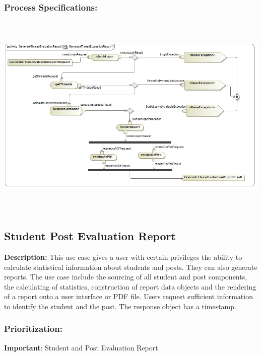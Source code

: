 \documentclass[a4paper,11pt]{article}
\begin{document}
\subsubsection{Process Specifications:} 
\includegraphics[width=15cm,height=10cm]{./Images/Report/ThreadReport_PS}

\subsection{Student Post Evaluation Report}
\textbf{Description:}
This use case gives a user with certain privileges the ability to calculate statistical information about students and posts. They can also generate reports. The use case include the sourcing of all student and post components, the calculating of statistics, construction of report data objects and the rendering of a report onto a user interface or PDF file. Users request sufficient information to identify the student and the post. The response object has a timestamp.
\subsubsection{Prioritization:} 
\textbf{Important}: Student and Post Evaluation Report
\end{document}
